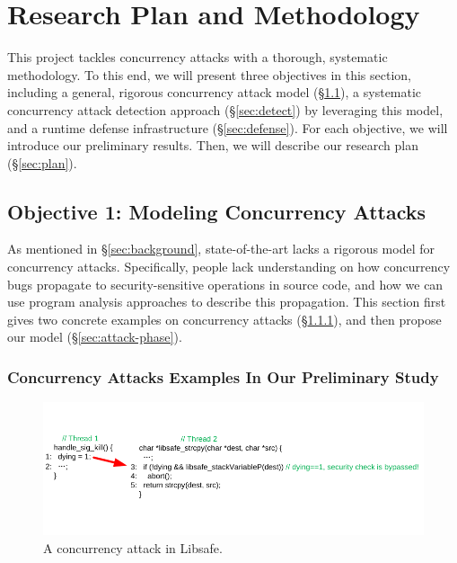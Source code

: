 \section{Research Plan and Methodology} \label{sec:rep}

This \xxx project tackles concurrency attacks with a thorough, systematic 
methodology. To this end, we will present three objectives in this section, including 
a general, rigorous concurrency attack model (\S\ref{sec:model}), 
a systematic concurrency attack detection approach 
(\S\ref{sec:detect}) by leveraging this model, and a runtime defense 
infrastructure (\S\ref{sec:defense}). For each objective, we will introduce our preliminary results. 
Then, we will describe our research plan (\S\ref{sec:plan}).

\vspace{-.15in}\subsection{Objective 1: Modeling Concurrency Attacks} 
\label{sec:model}\vspace{-.075in}

As mentioned in \S\ref{sec:background}, state-of-the-art lacks a rigorous model 
for concurrency attacks. Specifically, people lack understanding on how 
concurrency bugs propagate to security-sensitive operations in source code, and 
how we can use program analysis approaches to describe this propagation. This 
section first gives two concrete examples on concurrency attacks 
(\S\ref{sec:examples}), and then propose our model (\S\ref{sec:attack-phase}).

\vspace{-.15in}\subsubsection{Concurrency Attacks Examples In Our Preliminary Study} 
\label{sec:examples}\vspace{-.075in}

\begin{figure}[h]
\centering
\includegraphics[width=0.8\columnwidth]{figures/libsafe}
\vspace{-.05in}
\caption{{A concurrency attack in Libsafe.}} \label{fig:libsafe}
\vspace{-.05in}
\end{figure}

